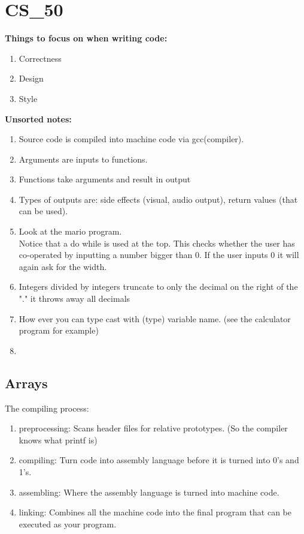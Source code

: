 \documentclass[12pt, letterpaper]{report}
\begin{document}
\chapter{CS\_50}
\textbf{Things to focus on when writing code:}
\begin{enumerate}
	\item Correctness
	\item Design
	\item Style
\end{enumerate}


\textbf{Unsorted notes:}
\begin{enumerate}
	\item Source code is compiled into machine code via gcc(compiler).
	\item Arguments are inputs to functions.
	\item Functions take arguments and result in output
	\item Types of outputs are: side effects (visual, audio output), return values (that can be used).
	\item Look at the mario program. \\
		Notice that a do while is used at the top. This checks whether the user has co-operated by inputting a number bigger than 0. If the user inputs 0 it will again ask for the width.
	\item Integers divided by integers truncate to only the decimal on the right of the "." it throws away all decimals
	\item How ever you can type cast with (type) variable name. (see the calculator program for example)
	\item 
\end{enumerate}

\section{Arrays}

The compiling process:

\begin{enumerate}
	\item preprocessing: Scans header files for relative prototypes. (So the compiler knows what printf is)
	\item compiling: Turn code into assembly language before it is turned into 0's and 1's.
	\item assembling: Where the assembly language is turned into machine code.
	\item linking: Combines all the machine code into the final program that can be executed as your program.
\end{enumerate}
\end{document}
